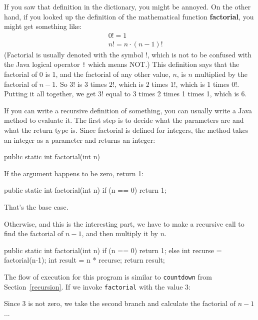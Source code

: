 \documentclass{book}
\begin{document}
If you saw that definition in the dictionary, you might be
annoyed.  On the other hand, if you looked up the definition
of the mathematical function {\bf factorial}, you might
get something like:
%
\begin{eqnarray*}
&&  0! = 1 \\
&&  n! = n \cdot(n-1)!
\end{eqnarray*}
%
(Factorial is usually denoted with the symbol $!$, which is
not to be confused with the Java logical operator {\tt !} which
means NOT.)  This definition says that the factorial of 0 is 1,
and the factorial of any other value, $n$, is $n$ multiplied
by the factorial of $n-1$.  So $3!$ is 3 times $2!$, which is 2 times
$1!$, which is 1 times $0!$.  Putting it all together, we get
$3!$ equal to 3 times 2 times 1 times 1, which is 6.

If you can write a recursive definition of something, you can usually
write a Java method to evaluate it.  The first step is to decide what
the parameters are and what the return type is.  Since factorial is
defined for integers, the method takes an
integer as a parameter and returns an integer:

\begin{verbatimtab}
  public static int factorial(int n) {
  }
\end{verbatimtab}

\noindent If the argument happens to be zero, return 1:

\begin{verbatimtab}
  public static int factorial(int n) {
    if (n == 0) {
      return 1;
    }
  }
\end{verbatimtab}
%
That's the base case.

Otherwise, and this is the interesting part, we have to make
a recursive call to find the factorial of $n-1$, and then
multiply it by $n$.

\begin{verbatimtab}
  public static int factorial(int n) {
    if (n == 0) {
      return 1;
    } else {
      int recurse = factorial(n-1);
      int result = n * recurse;
      return result;
    }
  }
\end{verbatimtab}
%
The flow of execution for this program is similar to {\tt countdown}
from Section~\ref{recursion}.
If we invoke {\tt factorial} with the value 3:

Since 3 is not zero, we take the second branch and calculate
the factorial of $n-1$...
\end{document}
